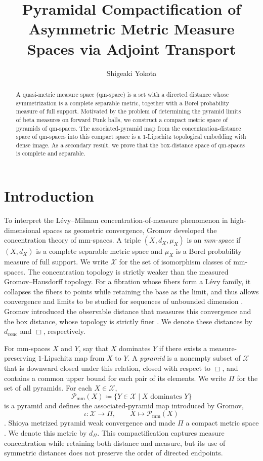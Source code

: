 \documentclass{amsart}
\title[Pyramidal Compactification via Adjoint Transport]{Pyramidal Compactification of Asymmetric Metric Measure Spaces via Adjoint Transport}
\author{Shigeaki Yokota}
\date{}
\theoremstyle{plain}
\theoremstyle{definition}
\theoremstyle{remark}
\newcommand{\X}{\mathcal{X}}
\newcommand{\dconc}{d_{\operatorname{conc}}}
\begin{document}
\begin{abstract}
A quasi-metric measure space (qm-space) is a set with a directed distance whose symmetrization is a complete separable metric, together with a Borel probability measure of full support. Motivated by the problem of determining the pyramid limits of beta measures on forward Funk balls, we construct a compact metric space of pyramids of qm-spaces. The associated-pyramid map from the concentration-distance space of qm-spaces into this compact space is a $1$-Lipschitz topological embedding with dense image. As a secondary result, we prove that the box-distance space of qm-spaces is complete and separable.
\end{abstract}

\maketitle

\section{Introduction}
\label{sec:introduction}
To interpret the L\'evy--Milman concentration-of-measure phenomenon in high-dimensional spaces as geometric convergence, Gromov developed the concentration theory of mm-spaces. A triple $(X,d_X,\mu_X)$ is an \emph{mm-space} if $(X,d_X)$ is a complete separable metric space and $\mu_X$ is a Borel probability measure of full support. We write $\X$ for the set of isomorphism classes of mm-spaces. The concentration topology is strictly weaker than the measured Gromov--Hausdorff topology. For a fibration whose fibers form a L\'evy family, it collapses the fibers to points while retaining the base as the limit, and thus allows convergence and limits to be studied for sequences of unbounded dimension \cite[Introduction]{shioya2016mmg}. Gromov introduced the observable distance that measures this convergence and the box distance, whose topology is strictly finer \cite{gromov2007met}. We denote these distances by $\dconc$ and $\Box$, respectively.

For mm-spaces $X$ and $Y$, say that $X$ dominates $Y$ if there exists a measure-preserving $1$-Lipschitz map from $X$ to $Y$. A \emph{pyramid} is a nonempty subset of $\X$ that is downward closed under this relation, closed with respect to $\Box$, and contains a common upper bound for each pair of its elements. We write $\Pi$ for the set of all pyramids. For each $X\in\X$,
\[\mathcal P_{\mathrm{mm}}(X)\coloneqq\{Y\in\X\mid X\text{ dominates }Y\}\]
is a pyramid and defines the associated-pyramid map introduced by Gromov,
\[\iota\colon\X\longrightarrow\Pi,\qquad X\longmapsto\mathcal P_{\mathrm{mm}}(X)\]
\cite{gromov2007met,esaki-kazukawa-mitsuishi2024cones}. Shioya metrized pyramid weak convergence and made $\Pi$ a compact metric space \cite[Definition~4.5 and Theorem~4.6]{shioya2022sugaku}. We denote this metric by $d_\Pi$. This compactification captures measure concentration while retaining both distance and measure, but its use of symmetric distances does not preserve the order of directed endpoints.
\end{document}
